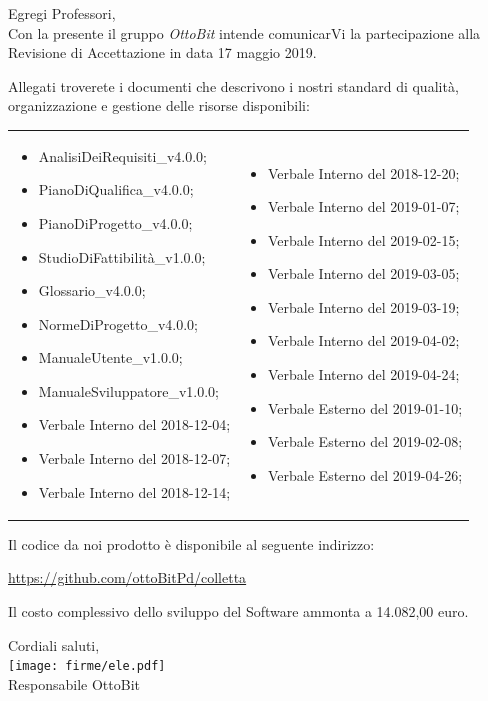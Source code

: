 \documentclass[11pt,a4paper]{article}
\begin{document}
\begin{minipage}{0.95\textwidth}
Egregi Professori,\\
Con la presente il gruppo \textit{OttoBit} intende comunicarVi la partecipazione alla Revisione di Accettazione in data 17 maggio 2019.

Allegati troverete i documenti che descrivono i nostri standard di qualità, organizzazione e gestione delle risorse disponibili:

\begin{tabular}{p{}|p{}}

	\begin{itemize}
	\item AnalisiDeiRequisiti\_v4.0.0;
	\item PianoDiQualifica\_v4.0.0;
	\item PianoDiProgetto\_v4.0.0;
	\item StudioDiFattibilità\_v1.0.0;
	\item Glossario\_v4.0.0;
	\item NormeDiProgetto\_v4.0.0;
	\item ManualeUtente\_v1.0.0;
	\item ManualeSviluppatore\_v1.0.0;
	\item Verbale Interno del 2018-12-04;
	\item Verbale Interno del 2018-12-07;
	\item Verbale Interno del 2018-12-14;
	\end{itemize}
	& 
	\begin{itemize}
		
		\item Verbale Interno del 2018-12-20;
		\item Verbale Interno del 2019-01-07;
		\item Verbale Interno del 2019-02-15;
		\item Verbale Interno del 2019-03-05;
		\item Verbale Interno del 2019-03-19;
		\item Verbale Interno del 2019-04-02;
		\item Verbale Interno del 2019-04-24;
		\item Verbale Esterno del 2019-01-10;
		\item Verbale Esterno del 2019-02-08;
		\item Verbale Esterno del 2019-04-26;
	\end{itemize}\\
\end{tabular}

Il codice da noi prodotto è disponibile al seguente indirizzo:
\begin{center}
	\url{https://github.com/ottoBitPd/colletta}
\end{center}
Il costo complessivo dello sviluppo del Software ammonta a 14.082,00 euro.

\end{minipage}

	\hfill
	\begin{minipage}{0.3\textwidth}\raggedleft
	\vspace{3em}
	Cordiali saluti,\\
	\vspace{1em}
	\texttt{[image: firme/ele.pdf]}
	\\Responsabile OttoBit
	
\end{minipage}
\end{document}
